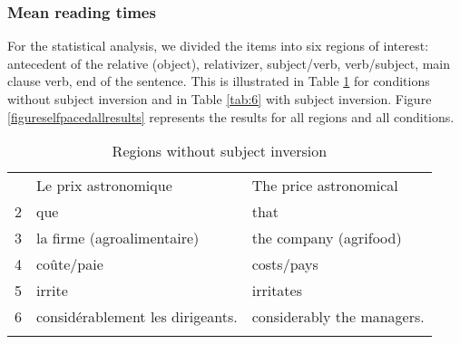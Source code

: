 \documentclass[output=paper]{langscibook}
\begin{document}
\subsubsection{Mean reading times}
For the statistical analysis, we divided the items into six regions of interest: antecedent of the relative (object), relativizer, subject/verb, verb/subject, main clause verb, end of the sentence. This is illustrated in Table \ref{tab:5} for conditions without subject inversion and in Table \ref{tab:6} with subject inversion. Figure \ref{figureselfpacedallresults} represents the results for all regions and all conditions. 


\begin{table}
 \begin{tabular}{lll}
 \lsptoprule
 1 & Le prix astronomique  & The  price astronomical\\     
 2 & que & that \\    
 3 & la firme (agroalimentaire) & the  company  (agrifood)\\
 4 & coûte/paie & costs/pays\\                                                      
 5 & irrite & irritates\\                                                                        
 6 & considérablement les dirigeants. & considerably the managers. \\                                                                                      
 \lspbottomrule
 \end{tabular}
 \caption{Regions without subject inversion\label{tab:5}}
\end{table}
\end{document}
